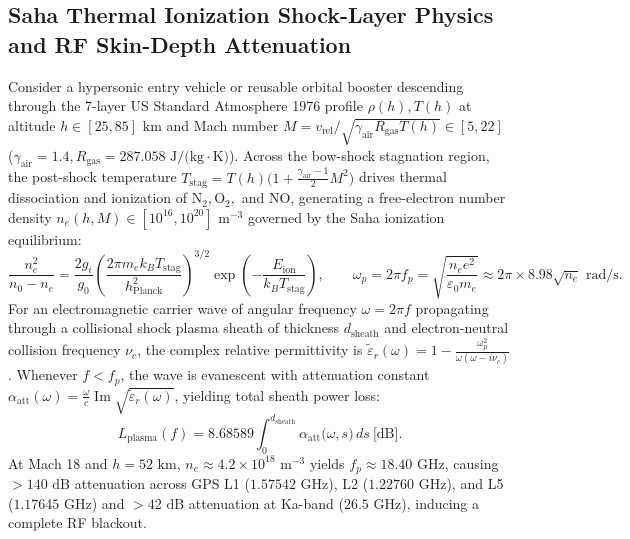 \documentclass[11pt,a4paper]{article}
\theoremstyle{plain}
\theoremstyle{definition}
\theoremstyle{remark}
\begin{document}
\subsection{Saha Thermal Ionization Shock-Layer Physics and RF Skin-Depth Attenuation}

Consider a hypersonic entry vehicle or reusable orbital booster descending through the 7-layer US Standard Atmosphere 1976 profile $\rho(h), T(h)$ at altitude $h \in [25, 85]\text{ km}$ and Mach number $M = v_{\text{rel}} / \sqrt{\gamma_{\text{air}} R_{\text{gas}} T(h)} \in [5, 22]$ ($\gamma_{\text{air}} = 1.4, R_{\text{gas}} = 287.058\text{ J/(kg}\cdot\text{K)}$). Across the bow-shock stagnation region, the post-shock temperature $T_{\text{stag}} = T(h)\bigl(1 + \frac{\gamma_{\text{air}}-1}{2}M^2\bigr)$ drives thermal dissociation and ionization of $\text{N}_2, \text{O}_2,$ and $\text{NO}$, generating a free-electron number density $n_e(h,M) \in [10^{16}, 10^{20}]\text{ m}^{-3}$ governed by the Saha ionization equilibrium:
\begin{equation}\label{eq:saha_ionization}
  \frac{n_e^2}{n_0 - n_e} = \frac{2 g_i}{g_0}\left(\frac{2\pi m_e k_B T_{\text{stag}}}{h_{\text{Planck}}^2}\right)^{3/2} \exp\!\left(-\frac{E_{\text{ion}}}{k_B T_{\text{stag}}}\right), \qquad \omega_p = 2\pi f_p = \sqrt{\frac{n_e e^2}{\varepsilon_0 m_e}} \approx 2\pi \times 8.98\sqrt{n_e}\text{ rad/s}.
\end{equation}
For an electromagnetic carrier wave of angular frequency $\omega = 2\pi f$ propagating through a collisional shock plasma sheath of thickness $d_{\text{sheath}}$ and electron-neutral collision frequency $\nu_c$, the complex relative permittivity is $\tilde{\varepsilon}_r(\omega) = 1 - \frac{\omega_p^2}{\omega(\omega - i\nu_c)}$. Whenever $f < f_p$, the wave is evanescent with attenuation constant $\alpha_{\text{att}}(\omega) = \frac{\omega}{c}\operatorname{Im}\sqrt{\tilde{\varepsilon}_r(\omega)}$, yielding total sheath power loss:
\begin{equation}\label{eq:plasma_attenuation_db}
  L_{\text{plasma}}(f) = 8.68589 \int_0^{d_{\text{sheath}}} \alpha_{\text{att}}\bigl(\omega, s\bigr)\,ds \ \text{[dB]}.
\end{equation}
At Mach 18 and $h = 52\text{ km}$, $n_e \approx 4.2\times 10^{18}\text{ m}^{-3}$ yields $f_p \approx 18.40\text{ GHz}$, causing $> 140\text{ dB}$ attenuation across GPS L1 ($1.57542\text{ GHz}$), L2 ($1.22760\text{ GHz}$), and L5 ($1.17645\text{ GHz}$) and $> 42\text{ dB}$ attenuation at Ka-band ($26.5\text{ GHz}$), inducing a complete RF blackout.
\end{document}
